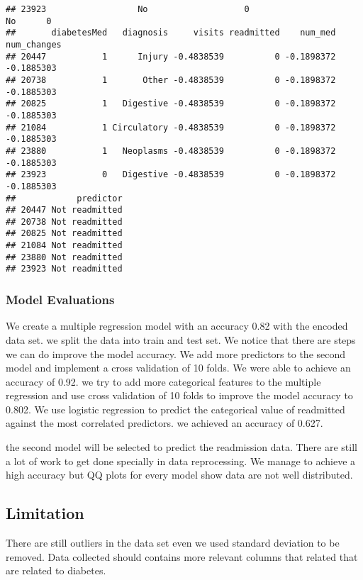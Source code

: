 \documentclass[
]{article}
\begin{document}
\begin{verbatim}
## 23923                  No                   0                     No      0
##       diabetesMed   diagnosis     visits readmitted    num_med num_changes
## 20447           1      Injury -0.4838539          0 -0.1898372  -0.1885303
## 20738           1       Other -0.4838539          0 -0.1898372  -0.1885303
## 20825           1   Digestive -0.4838539          0 -0.1898372  -0.1885303
## 21084           1 Circulatory -0.4838539          0 -0.1898372  -0.1885303
## 23880           1   Neoplasms -0.4838539          0 -0.1898372  -0.1885303
## 23923           0   Digestive -0.4838539          0 -0.1898372  -0.1885303
##            predictor
## 20447 Not readmitted
## 20738 Not readmitted
## 20825 Not readmitted
## 21084 Not readmitted
## 23880 Not readmitted
## 23923 Not readmitted
\end{verbatim}

\hypertarget{model-evaluations}{%
\subsubsection{Model Evaluations}\label{model-evaluations}}

We create a multiple regression model with an accuracy 0.82 with the
encoded data set. we split the data into train and test set. We notice
that there are steps we can do improve the model accuracy. We add more
predictors to the second model and implement a cross validation of 10
folds. We were able to achieve an accuracy of 0.92. we try to add more
categorical features to the multiple regression and use cross validation
of 10 folds to improve the model accuracy to 0.802. We use logistic
regression to predict the categorical value of readmitted against the
most correlated predictors. we achieved an accuracy of 0.627.

the second model will be selected to predict the readmission data. There
are still a lot of work to get done specially in data reprocessing. We
manage to achieve a high accuracy but QQ plots for every model show data
are not well distributed.

\hypertarget{limitation}{%
\subsection{Limitation}\label{limitation}}

There are still outliers in the data set even we used standard deviation
to be removed. Data collected should contains more relevant columns that
related that are related to diabetes.
\end{document}
